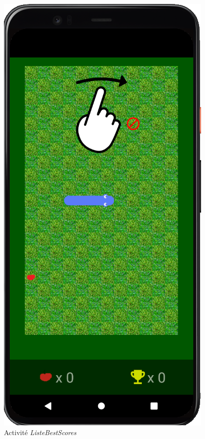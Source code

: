 \documentclass{article}
\begin{document}
\begin{figure}[H]
\begin{minipage}[c]{.3\linewidth}
        \includegraphics[scale=0.3]{Jeu.png}
        \caption{Activité \textit{ListeBestScores}}
    \end{minipage}
    \hfill
    \begin{minipage}[c]{.3\linewidth}
        \centering

\end{minipage}
\end{figure}
\end{document}
